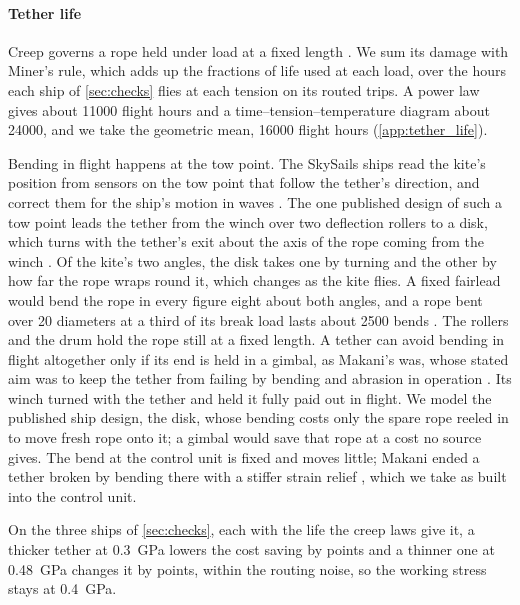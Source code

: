 \paragraph{Tether life} Creep governs a rope held under load at a fixed length \citep{bosman2013}. We sum its damage with Miner's rule, which adds up the fractions of life used at each load, over the hours each ship of \cref{sec:checks} flies at each tension on its routed trips. A power law gives about \num{11000} flight hours and a time--tension--temperature diagram about \num{24000}, and we take the geometric mean, \num{16000} flight hours (\cref{app:tether_life}).

Bending in flight happens at the tow point. The SkySails ships read the kite's position from sensors on the tow point that follow the tether's direction, and correct them for the ship's motion in waves \citep{erhard2013b}. The one published design of such a tow point leads the tether from the winch over two deflection rollers to a disk, which turns with the tether's exit about the axis of the rope coming from the winch \citep{skysails_patent_US11578697}. Of the kite's two angles, the disk takes one by turning and the other by how far the rope wraps round it, which changes as the kite flies. A fixed fairlead would bend the rope in every figure eight about both angles, and a rope bent over 20 diameters at a third of its break load lasts about \num{2500} bends \citep{davies2015}. The rollers and the drum hold the rope still at a fixed length. A tether can avoid bending in flight altogether only if its end is held in a gimbal, as Makani's was, whose stated aim was to keep the tether from failing by bending and abrasion in operation \citep{echeverri2020part2}. Its winch turned with the tether and held it fully paid out in flight. We model the published ship design, the disk, whose bending costs only the spare rope reeled in to move fresh rope onto it; a gimbal would save that rope at a cost no source gives. The bend at the control unit is fixed and moves little; Makani ended a tether broken by bending there with a stiffer strain relief \citep{echeverri2020part2}, which we take as built into the control unit.

On the three ships of \cref{sec:checks}, each with the life the creep laws give it, a thicker tether at \SI{0.3}{GPa} lowers the cost saving by  points and a thinner one at \SI{0.48}{GPa} changes it by  points, within the routing noise, so the working stress stays at \SI{0.4}{GPa}.

